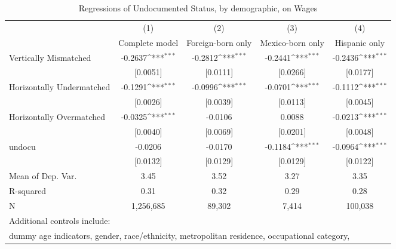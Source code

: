 \begin{table}[htbp]\centering
\def\sym#1{\ifmmode^{#1}\else\(^{#1}\)\fi}
\caption{Regressions of Undocumented Status, by demographic, on Wages}
\begin{tabular}{l*{4}{c}}
\toprule
                    &\multicolumn{1}{c}{(1)}         &\multicolumn{1}{c}{(2)}         &\multicolumn{1}{c}{(3)}         &\multicolumn{1}{c}{(4)}         \\
                    &Complete model         &Foreign-born only         &Mexico-born only         &Hispanic only         \\
\midrule
Vertically Mismatched&     -0.2637\sym{***}&     -0.2812\sym{***}&     -0.2441\sym{***}&     -0.2436\sym{***}\\
                    &    [0.0051]         &    [0.0111]         &    [0.0266]         &    [0.0177]         \\
\addlinespace
Horizontally Undermatched&     -0.1291\sym{***}&     -0.0996\sym{***}&     -0.0701\sym{***}&     -0.1112\sym{***}\\
                    &    [0.0026]         &    [0.0039]         &    [0.0113]         &    [0.0045]         \\
\addlinespace
Horizontally Overmatched&     -0.0325\sym{***}&     -0.0106         &      0.0088         &     -0.0213\sym{***}\\
                    &    [0.0040]         &    [0.0069]         &    [0.0201]         &    [0.0048]         \\
\addlinespace
undocu              &     -0.0206         &     -0.0170         &     -0.1184\sym{***}&     -0.0964\sym{***}\\
                    &    [0.0132]         &    [0.0129]         &    [0.0129]         &    [0.0122]         \\
\midrule
Mean of Dep. Var.   &        3.45         &        3.52         &        3.27         &        3.35         \\
R-squared           &        0.31         &        0.32         &        0.29         &        0.28         \\
N                   &   1,256,685         &      89,302         &       7,414         &     100,038         \\
\bottomrule
\multicolumn{5}{l}{\footnotesize Additional controls include:}\\
\multicolumn{5}{l}{\footnotesize dummy age indicators, gender, race/ethnicity, metropolitan residence, occupational category,}\\

\end{tabular}
\end{table}
